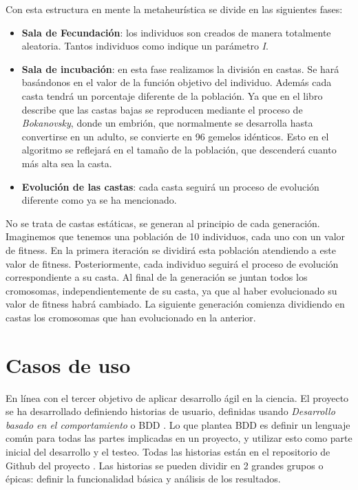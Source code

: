 Con esta estructura en mente la metaheurística se divide en las siguientes fases:

\begin{itemize}
    \item \textbf{Sala de Fecundación}: los individuos son creados de manera totalmente aleatoria. Tantos individuos
    como indique un parámetro \textit{I}.
    \item \textbf{Sala de incubación}: en esta fase realizamos la división en castas. Se hará basándonos en el valor de
    la función objetivo del individuo. Además cada casta tendrá un porcentaje diferente de la población. Ya que en el libro
    describe que las castas bajas se reproducen mediante el proceso de \textit{Bokanovsky}, donde un embrión, que normalmente 
    se desarrolla hasta convertirse en un adulto, se convierte en 96 gemelos idénticos. Esto en el algoritmo se reflejará 
    en el tamaño de la población, que descenderá cuanto más alta sea la casta.    
    \item \textbf{Evolución de las castas}: cada casta seguirá un proceso de evolución diferente como ya se 
    ha mencionado.
\end{itemize}

No se trata de castas estáticas, se generan al principio de cada generación. Imaginemos que tenemos una población de 10 individuos, cada 
uno con un valor de fitness. En la primera iteración se dividirá esta población atendiendo a este valor de fitness. Posteriormente,
cada individuo seguirá el proceso de evolución correspondiente a su casta. Al final de la generación se juntan todos los cromosomas,
independientemente de su casta, ya que al haber evolucionado su valor de fitness habrá cambiado. La siguiente generación comienza
dividiendo en castas los cromosomas que han evolucionado en la anterior.

\section{Casos de uso}

En línea con el tercer objetivo de aplicar desarrollo ágil en la ciencia. El proyecto se ha desarrollado definiendo
historias de usuario, definidas usando \emph{Desarrollo basado en el comportamiento} o BDD \cite{BDD}. Lo que 
plantea BDD es definir un lenguaje común para todas las partes implicadas en un proyecto, y utilizar esto como parte inicial 
del desarrollo y el testeo. Todas las historias están en el repositorio de Github del proyecto \cite{project_repository}.
Las historias se pueden dividir en 2 grandes grupos o épicas: definir la funcionalidad básica y análisis de los resultados.

